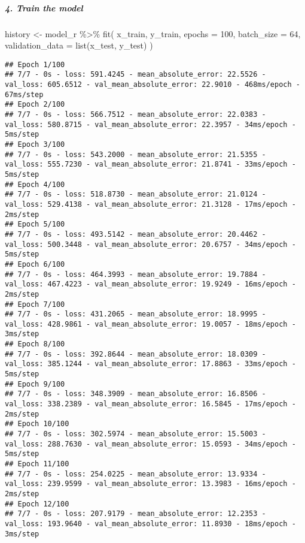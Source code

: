 \documentclass[
]{article}
\newenvironment{Shaded}{\begin{snugshade}}{\end{snugshade}}
\newcommand{\AttributeTok}[1]{\textcolor[rgb]{0.77,0.63,0.00}{#1}}
\newcommand{\DecValTok}[1]{\textcolor[rgb]{0.00,0.00,0.81}{#1}}
\newcommand{\FunctionTok}[1]{\textcolor[rgb]{0.00,0.00,0.00}{#1}}
\newcommand{\NormalTok}[1]{#1}
\newcommand{\OtherTok}[1]{\textcolor[rgb]{0.56,0.35,0.01}{#1}}
\newcommand{\SpecialCharTok}[1]{\textcolor[rgb]{0.00,0.00,0.00}{#1}}
\begin{document}
\hypertarget{train-the-model}{%
\subparagraph{4. Train the model}\label{train-the-model}}

\begin{Shaded}
\begin{Highlighting}[]
\NormalTok{history }\OtherTok{\textless{}{-}}\NormalTok{ model\_r }\SpecialCharTok{\%\textgreater{}\%} \FunctionTok{fit}\NormalTok{(}
\NormalTok{  x\_train, y\_train,}
  \AttributeTok{epochs =} \DecValTok{100}\NormalTok{,}
  \AttributeTok{batch\_size =} \DecValTok{64}\NormalTok{,}
  \AttributeTok{validation\_data =} \FunctionTok{list}\NormalTok{(x\_test, y\_test)}
\NormalTok{)}
\end{Highlighting}
\end{Shaded}

\begin{verbatim}
## Epoch 1/100
## 7/7 - 0s - loss: 591.4245 - mean_absolute_error: 22.5526 - val_loss: 605.6512 - val_mean_absolute_error: 22.9010 - 468ms/epoch - 67ms/step
## Epoch 2/100
## 7/7 - 0s - loss: 566.7512 - mean_absolute_error: 22.0383 - val_loss: 580.8715 - val_mean_absolute_error: 22.3957 - 34ms/epoch - 5ms/step
## Epoch 3/100
## 7/7 - 0s - loss: 543.2000 - mean_absolute_error: 21.5355 - val_loss: 555.7230 - val_mean_absolute_error: 21.8741 - 33ms/epoch - 5ms/step
## Epoch 4/100
## 7/7 - 0s - loss: 518.8730 - mean_absolute_error: 21.0124 - val_loss: 529.4138 - val_mean_absolute_error: 21.3128 - 17ms/epoch - 2ms/step
## Epoch 5/100
## 7/7 - 0s - loss: 493.5142 - mean_absolute_error: 20.4462 - val_loss: 500.3448 - val_mean_absolute_error: 20.6757 - 34ms/epoch - 5ms/step
## Epoch 6/100
## 7/7 - 0s - loss: 464.3993 - mean_absolute_error: 19.7884 - val_loss: 467.4223 - val_mean_absolute_error: 19.9249 - 16ms/epoch - 2ms/step
## Epoch 7/100
## 7/7 - 0s - loss: 431.2065 - mean_absolute_error: 18.9995 - val_loss: 428.9861 - val_mean_absolute_error: 19.0057 - 18ms/epoch - 3ms/step
## Epoch 8/100
## 7/7 - 0s - loss: 392.8644 - mean_absolute_error: 18.0309 - val_loss: 385.1244 - val_mean_absolute_error: 17.8863 - 33ms/epoch - 5ms/step
## Epoch 9/100
## 7/7 - 0s - loss: 348.3909 - mean_absolute_error: 16.8506 - val_loss: 338.2389 - val_mean_absolute_error: 16.5845 - 17ms/epoch - 2ms/step
## Epoch 10/100
## 7/7 - 0s - loss: 302.5974 - mean_absolute_error: 15.5003 - val_loss: 288.7630 - val_mean_absolute_error: 15.0593 - 34ms/epoch - 5ms/step
## Epoch 11/100
## 7/7 - 0s - loss: 254.0225 - mean_absolute_error: 13.9334 - val_loss: 239.9599 - val_mean_absolute_error: 13.3983 - 16ms/epoch - 2ms/step
## Epoch 12/100
## 7/7 - 0s - loss: 207.9179 - mean_absolute_error: 12.2353 - val_loss: 193.9640 - val_mean_absolute_error: 11.8930 - 18ms/epoch - 3ms/step

\end{verbatim}
\end{document}
